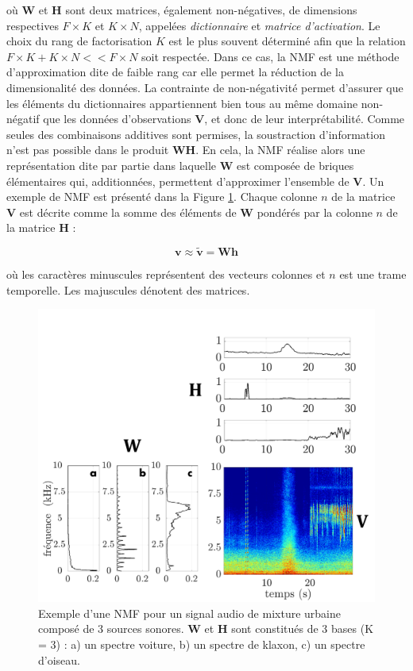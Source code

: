 où $\textbf{W}$ et $\textbf{H}$ sont deux matrices, également non-négatives, de dimensions respectives $F \times K$ et $K \times N$, appelées \textit{dictionnaire} et \textit{matrice d'activation}. Le choix du rang de factorisation $K$ est le plus souvent déterminé afin que la relation $F \times K + K \times N << F \times N$ soit respectée. Dans ce cas, la NMF est une méthode d'approximation dite de faible rang car elle permet la réduction de la dimensionalité des données. La contrainte de non-négativité permet d'assurer que les éléments du dictionnaires appartiennent bien tous au même domaine non-négatif que les données d'observations $\mathbf{V}$, et donc de leur interprétabilité. Comme seules des combinaisons additives sont permises, la soustraction d'information n'est pas possible dans le produit $\mathbf{WH}$. En cela, la NMF réalise alors une représentation dite \og par partie \fg{} dans laquelle $\mathbf{W}$ est composée de briques élémentaires qui, additionnées, permettent d'approximer l'ensemble de $\mathbf{V}$. Un exemple de NMF est présenté dans la Figure \ref{fig:ex_NMF}. Chaque colonne $n$ de la matrice $\mathbf{V}$ est décrite comme la somme des éléments de $\mathbf{W}$ pondérés par la colonne $n$ de la matrice $\mathbf{H}$ :

\begin{equation}\label{eq:nmf_h}
\mathbf{v} \approx \mathbf{\tilde{v}} =  \mathbf{Wh}
\end{equation}

où les caractères minuscules représentent des vecteurs colonnes et $n$ est une trame temporelle. Les majuscules dénotent des matrices.

\begin{figure}[t]
\centering
\includegraphics[width=.5\textwidth]{./figures/NMF/schema_introduction_nmf_fr.pdf}
\caption{Exemple d'une NMF pour un signal audio de mixture urbaine composé de 3 sources sonores. $\mathbf{W}$ et $\mathbf{H}$ sont constitués de 3 bases (K = 3) : a) un spectre voiture, b) un spectre de klaxon, c) un spectre d'oiseau.}
\label{fig:ex_NMF}
\end{figure}


